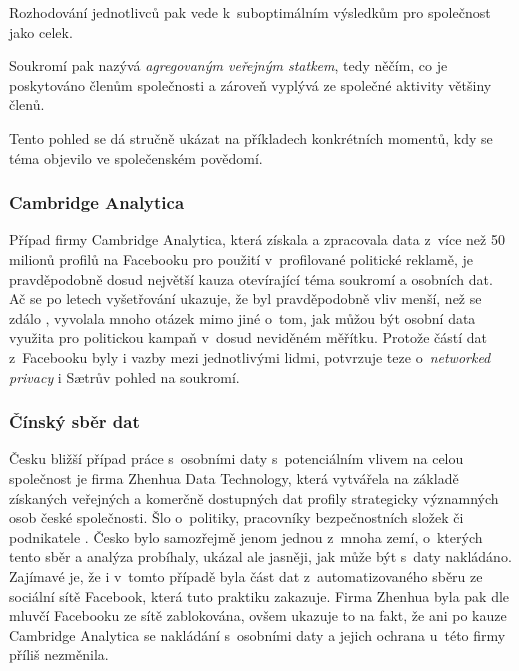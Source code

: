 \begin{displayquote}
	\citep{privacy-as-aggregate-public-good}
\end{displayquote}

Rozhodování jednotlivců pak vede k~suboptimálním výsledkům pro společnost jako celek.

Soukromí pak nazývá \textit{agregovaným veřejným statkem}, tedy něčím, co je poskytováno členům společnosti a zároveň vyplývá ze společné aktivity většiny členů.

Tento pohled se dá stručně ukázat na příkladech konkrétních momentů, kdy se téma objevilo ve společenském povědomí.

\subsubsection*{Cambridge Analytica}
Případ firmy Cambridge Analytica, která získala a zpracovala data z~více než 50 milionů profilů na Facebooku \citep{cambridge-analytica} pro použití v~profilované politické reklamě, je pravděpodobně dosud největší kauza otevírající téma soukromí a osobních dat. Ač se po letech vyšetřování ukazuje, že byl pravděpodobně vliv menší, než se zdálo \citep{ca-brexit, ca-elections}, vyvolala mnoho otázek mimo jiné o~tom, jak můžou být osobní data využita pro politickou kampaň v~dosud neviděném měřítku. Protože částí dat z~Facebooku byly i vazby mezi jednotlivými lidmi, potvrzuje teze o~\textit{networked privacy} i Sætrův pohled na soukromí.

\subsubsection*{Čínský sběr dat}
Česku bližší případ práce s~osobními daty s~potenciálním vlivem na celou společnost je firma Zhenhua Data Technology, která vytvářela na základě získaných veřejných a komerčně dostupných dat profily strategicky významných osob české společnosti. Šlo o~politiky, pracovníky bezpečnostních složek či podnikatele \citep{china-czech}. Česko bylo samozřejmě jenom jednou z~mnoha zemí, o~kterých tento sběr a analýza probíhaly, ukázal ale jasněji, jak může být s~daty nakládáno.
Zajímavé je, že i v~tomto případě byla část dat z~automatizovaného sběru ze sociální sítě Facebook, která tuto praktiku zakazuje. Firma Zhenhua byla pak dle mluvčí Facebooku ze sítě zablokována, ovšem ukazuje to na fakt, že ani po kauze Cambridge Analytica se nakládání s~osobními daty a jejich ochrana u~této firmy příliš nezměnila.

